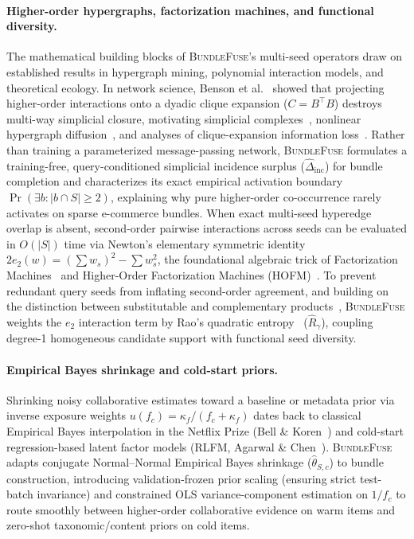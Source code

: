 \paragraph{Higher-order hypergraphs, factorization machines, and functional diversity.}
The mathematical building blocks of \textsc{BundleFuse}'s multi-seed operators draw on established results in
hypergraph mining, polynomial interaction models, and theoretical ecology. In network science, Benson et
al.~\cite{benson2018} showed that projecting higher-order interactions onto a dyadic clique expansion
($C = B^{\!\top}B$) destroys multi-way simplicial closure, motivating simplicial complexes~\cite{ebli2020},
nonlinear hypergraph diffusion~\cite{prokopchik2022}, and analyses of clique-expansion information
loss~\cite{lee2024}. Rather than training a parameterized message-passing network, \textsc{BundleFuse} formulates a
training-free, query-conditioned simplicial incidence surplus ($\hat{\Delta}_{\text{inc}}$) for bundle
completion and characterizes its exact empirical activation boundary $\Pr(\exists b : \lvert b \cap S\rvert \ge 2)$,
explaining why pure higher-order co-occurrence rarely activates on sparse e-commerce bundles. When exact
multi-seed hyperedge overlap is absent, second-order pairwise interactions across seeds can be evaluated in
$O(\lvert S\rvert)$ time via Newton's elementary symmetric identity $2e_2(w) = (\sum w_s)^2 - \sum w_s^2$, the
foundational algebraic trick of Factorization Machines~\cite{rendle2010} and Higher-Order Factorization Machines
(HOFM)~\cite{blondel2016}. To prevent redundant query seeds from inflating second-order agreement, and building
on the distinction between substitutable and complementary products~\cite{mcauley}, \textsc{BundleFuse} weights the
$e_2$ interaction term by Rao's quadratic entropy~\cite{rao1982} ($\hat{R}_{\gamma}$), coupling degree-1
homogeneous candidate support with functional seed diversity.

\paragraph{Empirical Bayes shrinkage and cold-start priors.}
Shrinking noisy collaborative estimates toward a baseline or metadata prior via inverse exposure weights
$u(f_c) = \kappa_f / (f_c + \kappa_f)$ dates back to classical Empirical Bayes interpolation in the Netflix
Prize (Bell \& Koren~\cite{bell2007}) and cold-start regression-based latent factor models (RLFM, Agarwal \&
Chen~\cite{agarwal2009}). \textsc{BundleFuse} adapts conjugate Normal--Normal Empirical Bayes shrinkage
($\hat{\theta}_{S,c}$) to bundle construction, introducing validation-frozen prior scaling (ensuring strict
test-batch invariance) and constrained OLS variance-component estimation on $1/f_c$ to route smoothly between
higher-order collaborative evidence on warm items and zero-shot taxonomic/content priors on cold items.

